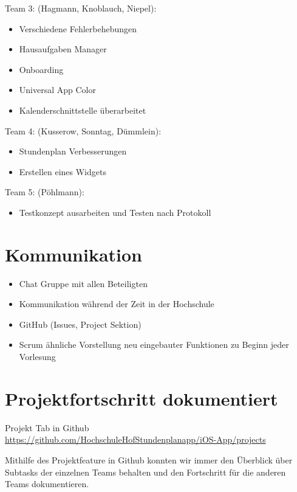 Team 3: (Hagmann, Knoblauch, Niepel):
\begin{itemize}
\item Verschiedene Fehlerbehebungen
\item Hausaufgaben Manager
\item Onboarding 
\item Universal App Color
\item Kalenderschnittstelle überarbeitet
\end{itemize}


Team 4: (Kusserow, Sonntag, Dümmlein):
\begin{itemize}
\item Stundenplan Verbesserungen


\item Erstellen eines Widgets
\end{itemize}


Team 5: (Pöhlmann):
\begin{itemize}
\item Testkonzept ausarbeiten und Testen nach Protokoll
\end{itemize}


\section{Kommunikation}
\begin{itemize}
\item Chat Gruppe mit allen Beteiligten
\item Kommunikation während der Zeit in der Hochschule
\item GitHub (Issues, Project Sektion)
\item Scrum ähnliche Vorstellung neu eingebauter Funktionen zu Beginn jeder Vorlesung
\end{itemize}


\section{Projektfortschritt dokumentiert}
Projekt Tab in Github\\
\url{https://github.com/HochschuleHofStundenplanapp/iOS-App/projects}

Mithilfe des Projektfeature in Github konnten wir immer den Überblick über Subtasks der einzelnen Teams behalten und den Fortschritt für die anderen Teams dokumentieren.




